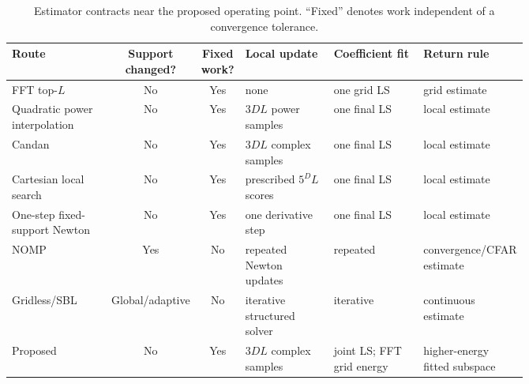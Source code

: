 \begin{table}[t]
\centering
\caption{Estimator contracts near the proposed operating point. ``Fixed'' denotes work independent of a convergence tolerance.}
\label{tab:closest_work}
\scriptsize
\setlength{\tabcolsep}{2.8pt}
\begin{tabular}{p{0.20\linewidth}ccp{0.18\linewidth}p{0.18\linewidth}p{0.20\linewidth}}
\toprule
Route & Support changed? & Fixed work? & Local update & Coefficient fit & Return rule \\
\midrule
FFT top-$L$ & No & Yes & none & one grid LS & grid estimate \\
Quadratic power interpolation & No & Yes & $3DL$ power samples & one final LS & local estimate \\
Candan \cite{candan2011three_dft} & No & Yes & $3DL$ complex samples & one final LS & local estimate \\
Cartesian local search & No & Yes & prescribed $5^D L$ scores & one final LS & local estimate \\
One-step fixed-support Newton & No & Yes & one derivative step & one final LS & local estimate \\
NOMP \cite{mamandipoor2016nomp} & Yes & No & repeated Newton updates & repeated & convergence/CFAR estimate \\
Gridless/SBL \cite{wu2023gridless_multifrequency,pote2025lws_sbl} & Global/adaptive & No & iterative structured solver & iterative & continuous estimate \\
Proposed & No & Yes & $3DL$ complex samples & joint LS; FFT grid energy & higher-energy fitted subspace \\
\bottomrule
\end{tabular}
\end{table}
